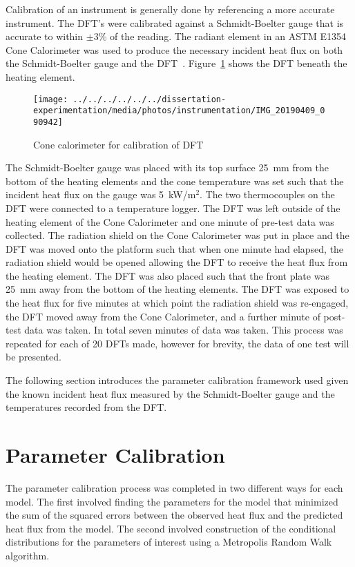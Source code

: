 \documentclass[article]{proc}
\begin{document}
    Calibration of an instrument is generally done by referencing a more accurate instrument. The DFT's were calibrated against a Schmidt-Boelter gauge that is accurate to within $\pm 3\%$ of the reading. The radiant element in an ASTM E1354 Cone Calorimeter was used to produce the necessary incident heat flux on both the Schmidt-Boelter gauge and the DFT~\cite{conecal}. Figure~\ref{fig:cone_dft} shows the DFT beneath the heating element. 

    \begin{figure}[h!]
        \centering
        \texttt{[image: ../../../../../../dissertation-experimentation/media/photos/instrumentation/IMG\_20190409\_090942]}
        \caption{Cone calorimeter for calibration of DFT}
        \label{fig:cone_dft}
    \end{figure}

    The Schmidt-Boelter gauge was placed with its top surface 25~mm from the bottom of the heating elements and the cone temperature was set such that the incident heat flux on the gauge was 5~kW/m$^2$. The two thermocouples on the DFT were connected to a temperature logger. The DFT was left outside of the heating element of the Cone Calorimeter and one minute of pre-test data was collected. The radiation shield on the Cone Calorimeter was put in place and the DFT was moved onto the platform such that when one minute had elapsed, the radiation shield would be opened allowing the DFT to receive the heat flux from the heating element. The DFT was also placed such that the front plate was 25~mm away from the bottom of the heating elements. The DFT was exposed to the heat flux for five minutes at which point the radiation shield was re-engaged, the DFT moved away from the Cone Calorimeter, and a further minute of post-test data was taken. In total seven minutes of data was taken. This process was repeated for each of 20 DFTs made, however for brevity, the data of one test will be presented. 

    The following section introduces the parameter calibration framework used given the known incident heat flux measured by the Schmidt-Boelter gauge and the temperatures recorded from the DFT. 

\section{Parameter Calibration}

    The parameter calibration process was completed in two different ways for each model. The first involved finding the parameters for the model that minimized the sum of the squared errors between the observed heat flux and the predicted heat flux from the model. The second involved construction of the conditional distributions for the parameters of interest using a Metropolis Random Walk algorithm. 
\end{document}
